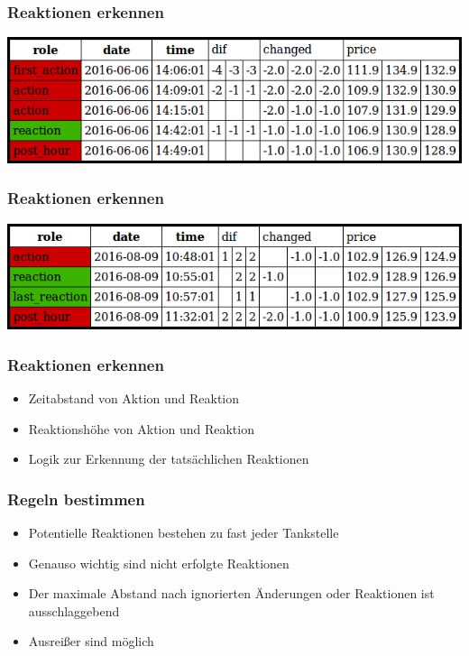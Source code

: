 \documentclass[hyperref={pdfpagelabels=false}]{beamer}
\begin{document}
\begin{frame}
\frametitle{Reaktionen erkennen}
\begin{center}
\includegraphics[scale=0.30]{masr.jpg}
\end{center}
\end{frame}

\begin{frame}
\frametitle{Reaktionen erkennen}
\begin{center}
\includegraphics[scale=0.30]{samr2.jpg}
\end{center}
\end{frame}

\begin{frame}
\frametitle{Reaktionen erkennen}
\begin{itemize}
\item Zeitabstand von Aktion und Reaktion
\item Reaktionshöhe von Aktion und Reaktion
\item Logik zur Erkennung der tatsächlichen Reaktionen
\end{itemize}
\end{frame}

\begin{frame}
\frametitle{Regeln bestimmen}
\begin{itemize}
\item Potentielle Reaktionen bestehen zu fast jeder Tankstelle
\item Genauso wichtig sind nicht erfolgte Reaktionen
\item Der maximale Abstand nach ignorierten Änderungen oder Reaktionen ist ausschlaggebend
\item Ausreißer sind möglich
\end{itemize}
\end{frame}
\end{document}

